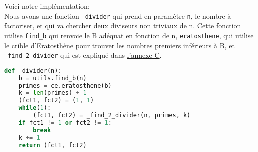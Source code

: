 Voici notre implémentation:\\

Nous avons une fonction \lstinline{_divider} qui prend en paramètre \lstinline{n}, le nombre à factoriser, et qui va chercher deux diviseurs non triviaux de n. 
Cette fonction utilise \lstinline{find_b} qui renvoie le B adéquat en fonction de n, \lstinline{eratosthene}, qui utilise \hyperref[Eratosthène]{le crible d'Eratosthène} pour trouver les nombres premiers inférieurs à B, et \lstinline{_find_2_divider} qui est expliqué dans \hyperref[Matrices]{l'annexe C}.
\clearpage
\begin{lstlisting}[language=Python]
def _divider(n):
    b = utils.find_b(n)
    primes = ce.eratosthene(b)
    k = len(primes) + 1
    (fct1, fct2) = (1, 1)
    while(1):
        (fct1, fct2) = _find_2_divider(n, primes, k)
	if fct1 != 1 or fct2 != 1:
		break
	k += 1
    return (fct1, fct2)
\end{lstlisting}
\vspace{1em}

